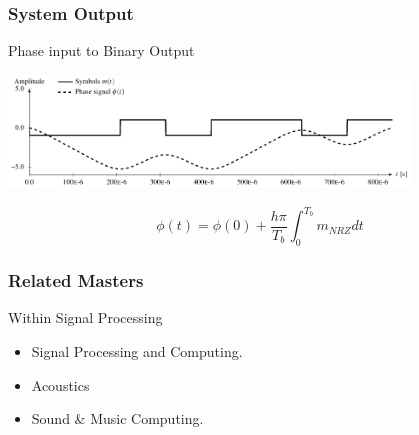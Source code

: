 \begin{frame}\frametitle{System Output}
    \begin{block}{Phase input to Binary Output} 
        \begin{center}
            \includegraphics[width=0.8\textwidth]{img/gfsk_integration} 
        \end{center}
        \begin{equation}
            \phi(t) = \phi(0) + \frac{h \pi}{T_b}\int_0^{T_b} m_{NRZ}dt
        \end{equation}
    \end{block}
\end{frame}


\begin{frame}\frametitle{Related Masters}
    \begin{block}{Within Signal Processing} 
     \begin{itemize}
         \item Signal Processing and Computing.
         \item Acoustics
         \item Sound \& Music Computing.
     \end{itemize}
    \end{block}
\end{frame}

